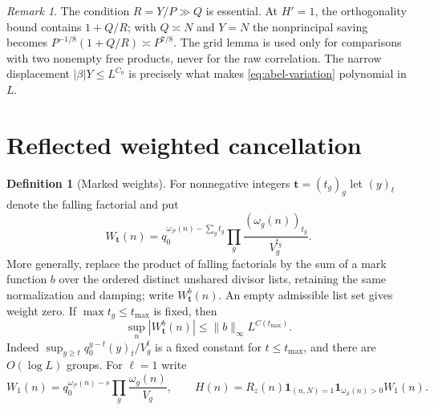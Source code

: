 \documentclass[11pt]{article}
\theoremstyle{definition}
\newtheorem{definition}[theorem]{Definition}
\newcommand{\ind}{\mathbf 1}
\newcommand{\Pset}{\mathcal P}
\newcommand{\Sset}{\mathcal S}
\newcommand{\Rz}{R_z}
\newcommand{\wt}{W_{\mathbf t}}
\theoremstyle{remark}
\newtheorem{remark}[theorem]{Remark}
\begin{document}
\begin{remark}\label{rem:raw-scale}
The condition $R=Y/P\gg Q$ is essential. At $H'=1$, the
orthogonality bound contains $1+Q/R$; with $Q\asymp N$ and $Y=N$
the nonprincipal saving becomes
$P^{-1/8}(1+Q/R)\asymp P^{7/8}$.
The grid lemma is used only for comparisons with two nonempty
free products, never for the raw correlation.
The narrow displacement $|\beta|Y\le L^{C_0}$ is precisely what
makes \eqref{eq:abel-variation} polynomial in $L$.
\end{remark}

\section{Reflected weighted cancellation}\label{sec:cancellation}

\begin{definition}[Marked weights]\label{def:weights}
For nonnegative integers $\mathbf t=(t_g)_g$ let $(y)_t$
denote the falling factorial and put
\begin{equation}\label{eq:marked-weight}
\wt(n)=q_0^{\omega_{\Pset}(n)-\sum_gt_g}
            \prod_g\frac{(\omega_g(n))_{t_g}}{V_g^{t_g}}.
\end{equation}
More generally, replace the product of falling factorials by the sum
of a mark function $b$ over the ordered distinct unshared divisor
lists, retaining the same normalization and damping; write
$W_{\mathbf t}^{b}(n)$.
An empty admissible list set gives weight zero. If $\max t_g\le t_{\max}$
is fixed, then
\begin{equation}\label{eq:marked-bound}
\sup_n|W_{\mathbf t}^{b}(n)|\le\|b\|_\infty L^{C(t_{\max})}.
\end{equation}
Indeed $\sup_{y\ge t}q_0^{y-t}(y)_t/V_g^t$ is a fixed constant
for $t\le t_{\max}$, and there are $O(\log L)$ groups.
For $\ell=1$ write
\begin{equation}\label{eq:raw-weight}
W_1(n)=q_0^{\omega_{\Pset}(n)-s}\prod_g\frac{\omega_g(n)}{V_g},
\qquad
H(n)=\Rz(n)\ind_{(n,N)=1}\ind_{\omega_{\Sset}(n)>0}W_1(n).
\end{equation}
\end{definition}
\end{document}
